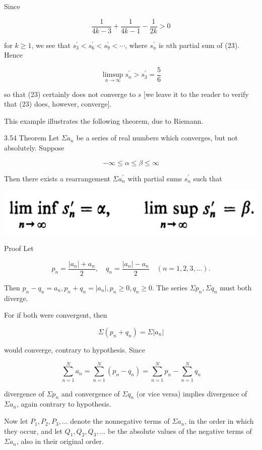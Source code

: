 \documentclass[10pt]{article}
\begin{document}
Since

$$
\frac{1}{4 k-3}+\frac{1}{4 k-1}-\frac{1}{2 k}>0
$$

for $k \geq 1$, we see that $s_{3}^{\prime}<s_{6}^{\prime}<s_{9}^{\prime}<\cdots$, where $s_{n}^{\prime}$ is $n$th partial sum of (23). Hence

$$
\limsup _{n \rightarrow \infty} s_{n}^{\prime}>s_{3}^{\prime}=\frac{5}{6}
$$

so that (23) certainly does not converge to $s$ [we leave it to the reader to verify that (23) does, however, converge].

This example illustrates the following theorem, due to Riemann.

3.54 Theorem Let $\Sigma a_{n}$ be a series of real numbers which converges, but not absolutely. Suppose

$$
-\infty \leq \alpha \leq \beta \leq \infty
$$

Then there exists a rearrangement $\Sigma a_{n}^{\prime}$ with partial sums $s_{n}^{\prime}$ such that

\begin{center}
\includegraphics[max width=\textwidth]{2023_08_17_055ccbec3ce53a1b74ebg-086}
\end{center}

Proof Let

$$
p_{n}=\frac{\left|a_{n}\right|+a_{n}}{2}, \quad q_{n}=\frac{\left|a_{n}\right|-a_{n}}{2} \quad(n=1,2,3, \ldots) .
$$

Then $p_{n}-q_{n}=a_{n}, p_{n}+q_{n}=\left|a_{n}\right|, p_{n} \geq 0, q_{n} \geq 0$. The series $\Sigma p_{n}, \Sigma q_{n}$ must both diverge.

For if both were convergent, then

$$
\Sigma\left(p_{n}+q_{n}\right)=\Sigma\left|a_{n}\right|
$$

would converge, contrary to hypothesis. Since

$$
\sum_{n=1}^{N} a_{n}=\sum_{n=1}^{N}\left(p_{n}-q_{n}\right)=\sum_{n=1}^{N} p_{n}-\sum_{n=1}^{N} q_{n}
$$

divergence of $\Sigma p_{n}$ and convergence of $\Sigma q_{n}$ (or vice versa) implies divergence of $\Sigma a_{n}$, again contrary to hypothesis.

Now let $P_{1}, P_{2}, P_{3}, \ldots$ denote the nonnegative terms of $\Sigma a_{n}$, in the order in which they occur, and let $Q_{1}, Q_{2}, Q_{3}, \ldots$ be the absolute values of the negative terms of $\Sigma a_{n}$, also in their original order.
\end{document}
